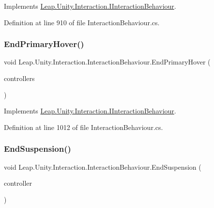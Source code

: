 Implements \mbox{\hyperlink{interface_leap_1_1_unity_1_1_interaction_1_1_i_interaction_behaviour_aba5485bd77f8d0a4d1af803a506f7c11}{Leap.\+Unity.\+Interaction.\+I\+Interaction\+Behaviour}}.



Definition at line 910 of file Interaction\+Behaviour.\+cs.

\mbox{\label{class_leap_1_1_unity_1_1_interaction_1_1_interaction_behaviour_a743fa15f979906b13265632db30c2d9c}} 
\subsubsection{\texorpdfstring{EndPrimaryHover()}{EndPrimaryHover()}}
{\footnotesize\ttfamily void Leap.\+Unity.\+Interaction.\+Interaction\+Behaviour.\+End\+Primary\+Hover (\begin{DoxyParamCaption}\item[{List$<$ \mbox{\hyperlink{class_leap_1_1_unity_1_1_interaction_1_1_interaction_controller}{Interaction\+Controller}} $>$}]{controllers }\end{DoxyParamCaption})}



Implements \mbox{\hyperlink{interface_leap_1_1_unity_1_1_interaction_1_1_i_interaction_behaviour_aeb05af074ee371e099c900f2970b74d7}{Leap.\+Unity.\+Interaction.\+I\+Interaction\+Behaviour}}.



Definition at line 1012 of file Interaction\+Behaviour.\+cs.

\mbox{\label{class_leap_1_1_unity_1_1_interaction_1_1_interaction_behaviour_a9ebdb659bd6a549e89a523771458244d}} 
\subsubsection{\texorpdfstring{EndSuspension()}{EndSuspension()}}
{\footnotesize\ttfamily void Leap.\+Unity.\+Interaction.\+Interaction\+Behaviour.\+End\+Suspension (\begin{DoxyParamCaption}\item[{\mbox{\hyperlink{class_leap_1_1_unity_1_1_interaction_1_1_interaction_controller}{Interaction\+Controller}}}]{controller }\end{DoxyParamCaption})}




